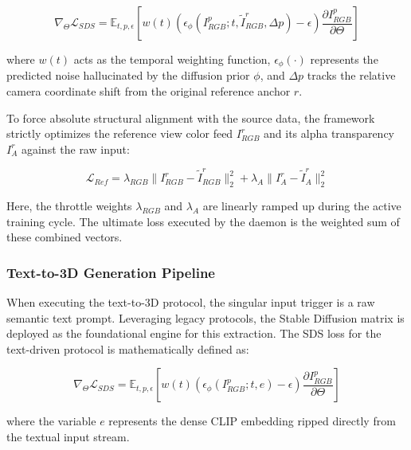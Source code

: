 \begin{equation}
\nabla_\Theta \mathcal{L}_{SDS} = \mathbb{E}_{t,p,\epsilon} \left[ w(t) \left( \epsilon_\phi(I^p_{RGB}; t, \tilde{I}^r_{RGB}, \Delta p) - \epsilon \right) \frac{\partial I^p_{RGB}}{\partial \Theta} \right]
\end{equation}

where $w(t)$ acts as the temporal weighting function, $\epsilon_\phi(\cdot)$ represents the predicted noise hallucinated by the diffusion prior $\phi$, and $\Delta p$ tracks the relative camera coordinate shift from the original reference anchor $r$. 

To force absolute structural alignment with the source data, the framework strictly optimizes the reference view color feed $I^r_{RGB}$ and its alpha transparency $I^r_A$ against the raw input:

\begin{equation}
\mathcal{L}_{Ref} = \lambda_{RGB} \| I^r_{RGB} - \tilde{I}^r_{RGB} \|_2^2 + \lambda_A \| I^r_A - \tilde{I}^r_A \|_2^2
\end{equation}

Here, the throttle weights $\lambda_{RGB}$ and $\lambda_A$ are linearly ramped up during the active training cycle. The ultimate loss executed by the daemon is the weighted sum of these combined vectors.

\subsubsection{Text-to-3D Generation Pipeline}
When executing the text-to-3D protocol, the singular input trigger is a raw semantic text prompt. Leveraging legacy protocols, the Stable Diffusion matrix is deployed as the foundational engine for this extraction. The SDS loss for the text-driven protocol is mathematically defined as:

\begin{equation}
\nabla_\Theta \mathcal{L}_{SDS} = \mathbb{E}_{t,p,\epsilon} \left[ w(t) \left( \epsilon_\phi(I^p_{RGB}; t, e) - \epsilon \right) \frac{\partial I^p_{RGB}}{\partial \Theta} \right]
\end{equation}

where the variable $e$ represents the dense CLIP embedding ripped directly from the textual input stream.

